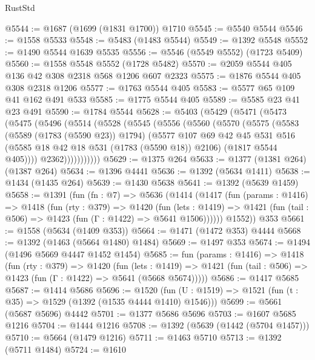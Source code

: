 \begin{lexlean}{RustStd}
\begin{coremodule}
@5544 := @1687 (@1699 (@1831 @1700)) @1710
@5545 := @5540 @5544
@5546 := @1558 @5533
@5548 := @5483 (@1483 @5544)
@5549 := @1392 @5548
@5552 := @1490 @5544 @1639 @5535
@5556 := @5546 (@5549 @5552) (@1723 @5409)
@5560 := @1558 @5548 @5552 (@1728 @5482)
@5570 := @2059 @5544 @405 @136 @42 @308 @2318 @568 @1206 @607 @2323
@5575 := @1876 @5544 @405 @308 @2318 @1206
@5577 := @1763 @5544 @405
@5583 := @5577 @65 @109 @41 @162 @491 @533
@5585 := @1775 @5544 @405
@5589 := @5585 @23 @41 @23 @491
@5590 := @1784 @5544
@5628 := @5403
    (@5429
      (@5471
        (@5473
          (@5475
            (@5496
              (@5514
                (@5528
                  (@5545
                    (@5556
                      (@5560
                        (@5570
                          (@5575
                            (@5583
                              (@5589 (@1783 (@5590 @23)) @1794)
                              (@5577
                                @107
                                @69
                                @42
                                @45
                                @531
                                @516
                                (@5585 @18 @42 @18 @531 (@1783 (@5590 @18)) @2106)
                                (@1817 @5544 @405))))
                          @2362)))))))))))
@5629 := @1375 @264
@5633 := @1377 (@1381 @264) (@1387 @264)
@5634 := @1396 @4441
@5636 := @1392 (@5634 @1411)
@5638 := @1434 (@1435 @264)
@5639 := @1430 @5638
@5641 := @1392 (@5639 @1459)
@5658 := @1391
    (fun (fn : @7) =>
    @5636
      (@1414
        (@1417
          (fun (params : @1416) =>
          @1418
            (fun (rty : @379) =>
            @1420
              (fun (lets : @1419) =>
              @1421 (fun (tail : @506) => @1423 (fun (Γ : @1422) => @5641 @1506))))))
        @1552))
    @353
@5661 := @1558 (@5634 (@1409 @353))
@5664 := @1471 (@1472 @353) @4444
@5668 := @1392 (@1463 (@5664 @1480) @1484)
@5669 := @1497 @353
@5674 := @1494 (@1496 @5669 @4447 @1452 @1454)
@5685 := fun (params : @1416) =>
  @1418
    (fun (rty : @379) =>
    @1420
      (fun (lets : @1419) =>
      @1421 (fun (tail : @506) => @1423 (fun (Γ : @1422) => @5641 (@5668 @5674)))))
@5686 := @1417 @5685
@5687 := @1414 @5686
@5696 := @1520 (fun (U : @1519) => @1521 (fun (t : @35) => @1529 (@1392 (@1535 @4444 @1410) @1546)))
@5699 := @5661 (@5687 @5696) @4442
@5701 := @1377 @5686 @5696
@5703 := @1607 @5685 @1216
@5704 := @1444 @1216
@5708 := @1392 (@5639 (@1442 (@5704 @1457)))
@5710 := @5664 (@1479 @1216)
@5711 := @1463 @5710
@5713 := @1392 (@5711 @1484)
@5724 := @1610

\end{coremodule}
\end{lexlean}
